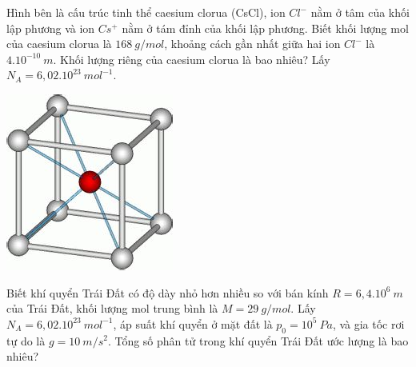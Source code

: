 \begin{vd}
	Hình bên là cấu trúc tinh thể caesium clorua (CsCl), ion $Cl^-$ nằm ở tâm của khối lập phương và ion $Cs^+$ nằm ở tám đỉnh của khối lập phương. Biết khối lượng mol của caesium clorua là $168 \ g/mol$, khoảng cách gần nhất giữa hai ion $Cl^-$ là $4.10^{-10} \ m$. Khối lượng riêng của caesium clorua là bao nhiêu? Lấy $N_A = 6,02.10^{23} \ mol^{-1}$.
	\begin{center}
		\includegraphics[scale=0.4]{img/8412619e887615d09147c0aadc784128.jpg}
	\end{center}
\end{vd}

\newpage
\begin{vd}
	Biết khí quyển Trái Đất có độ dày nhỏ hơn nhiều so với bán kính $R = 6,4.10^6 \ m$ của Trái Đất, khối lượng mol trung bình là $M = 29 \ g/mol$. Lấy $N_A = 6,02.10^{23} \ mol^{-1}$, áp suất khí quyển ở mặt đất là $p_0 = 10^5 \ Pa$, và gia tốc rơi tự do là $g = 10 \ m/s^2$. Tổng số phân tử trong khí quyển Trái Đất ước lượng là bao nhiêu?
	
\end{vd}